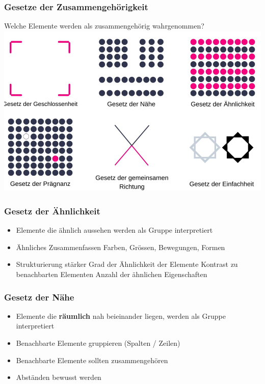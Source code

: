 \documentclass[a4paper, landscape, 8pt]{scrartcl}
\begin{document}
\begin{multicols*}{4}
        \subsubsection{Gesetze der Zusammengehörigkeit}
        Welche Elemente werden als zusammengehörig wahrgenommen? \\
        \includegraphics[width=\columnwidth]{graphic/11-usability-zusammen}

        \subsubsection{Gesetz der Ähnlichkeit}
        \begin{itemize}
            \item Elemente die ähnlich aussehen werden als Gruppe interpretiert
            \item Ähnliches Zusammenfassen
            \subitem Farben, Grössen, Bewegungen, Formen
            \item Strukturierung stärker
            \subitem Grad der Ähnlichkeit der Elemente
            \subitem Kontrast zu benachbarten Elementen
            \subitem Anzahl der ähnlichen Eigenschaften
        \end{itemize}

        \subsubsection{Gesetz der Nähe}
        \begin{itemize}
            \item Elemente die \textbf{räumlich} nah beieinander liegen, werden als Gruppe interpretiert
            \item Benachbarte Elemente gruppieren (Spalten / Zeilen)
            \item Benachbarte Elemente sollten zusammengehören
            \item Abständen bewusst werden
        \end{itemize}


\end{multicols*}
\end{document}
